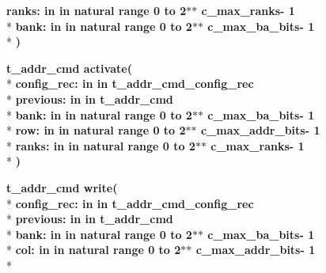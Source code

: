 \begin{DoxyCompactItemize}
{\bfseries \textcolor{vhdlchar}{ranks\+: }\textcolor{stringliteral}{in }\textcolor{vhdlchar}{in natural   range  0 to  2$\ast$$\ast$   c\+\_\+max\+\_\+ranks-\/ 1}}\\*
{\bfseries \textcolor{vhdlchar}{bank\+: }\textcolor{stringliteral}{in }\textcolor{vhdlchar}{in natural   range  0 to  2$\ast$$\ast$   c\+\_\+max\+\_\+ba\+\_\+bits-\/ 1}}\\*
{\bfseries  )} 
\item 
{\bfseries {\bfseries \textcolor{vhdlchar}{t\+\_\+addr\+\_\+cmd}\textcolor{vhdlchar}{ }}} {\bf activate}{\bfseries  ( }\\*
{\bfseries \textcolor{vhdlchar}{config\+\_\+rec\+: }\textcolor{stringliteral}{in }\textcolor{vhdlchar}{in t\+\_\+addr\+\_\+cmd\+\_\+config\+\_\+rec}}\\*
{\bfseries \textcolor{vhdlchar}{previous\+: }\textcolor{stringliteral}{in }\textcolor{vhdlchar}{in t\+\_\+addr\+\_\+cmd}}\\*
{\bfseries \textcolor{vhdlchar}{bank\+: }\textcolor{stringliteral}{in }\textcolor{vhdlchar}{in natural   range  0 to  2$\ast$$\ast$   c\+\_\+max\+\_\+ba\+\_\+bits-\/ 1}}\\*
{\bfseries \textcolor{vhdlchar}{row\+: }\textcolor{stringliteral}{in }\textcolor{vhdlchar}{in natural   range  0 to  2$\ast$$\ast$   c\+\_\+max\+\_\+addr\+\_\+bits-\/ 1}}\\*
{\bfseries \textcolor{vhdlchar}{ranks\+: }\textcolor{stringliteral}{in }\textcolor{vhdlchar}{in natural   range  0 to  2$\ast$$\ast$   c\+\_\+max\+\_\+ranks-\/ 1}}\\*
{\bfseries  )} 
\item 
{\bfseries {\bfseries \textcolor{vhdlchar}{t\+\_\+addr\+\_\+cmd}\textcolor{vhdlchar}{ }}} {\bf write}{\bfseries  ( }\\*
{\bfseries \textcolor{vhdlchar}{config\+\_\+rec\+: }\textcolor{stringliteral}{in }\textcolor{vhdlchar}{in t\+\_\+addr\+\_\+cmd\+\_\+config\+\_\+rec}}\\*
{\bfseries \textcolor{vhdlchar}{previous\+: }\textcolor{stringliteral}{in }\textcolor{vhdlchar}{in t\+\_\+addr\+\_\+cmd}}\\*
{\bfseries \textcolor{vhdlchar}{bank\+: }\textcolor{stringliteral}{in }\textcolor{vhdlchar}{in natural   range  0 to  2$\ast$$\ast$   c\+\_\+max\+\_\+ba\+\_\+bits-\/ 1}}\\*
{\bfseries \textcolor{vhdlchar}{col\+: }\textcolor{stringliteral}{in }\textcolor{vhdlchar}{in natural   range  0 to  2$\ast$$\ast$   c\+\_\+max\+\_\+addr\+\_\+bits-\/ 1}}\\*

\end{DoxyCompactItemize}
